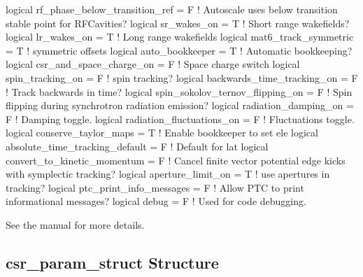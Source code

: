 {{{{{{{{\begin{example}
    logical rf_phase_below_transition_ref = F   ! Autoscale uses below transition stable point for RFCavities?
    logical sr_wakes_on = T                     ! Short range wakefields?
    logical lr_wakes_on = T                     ! Long range wakefields
    logical mat6_track_symmetric = T            ! symmetric offsets
    logical auto_bookkeeper = T                 ! Automatic bookkeeping?
    logical csr_and_space_charge_on = F         ! Space charge switch
    logical spin_tracking_on = F                ! spin tracking?
    logical backwards_time_tracking_on = F      ! Track backwards in time?
    logical spin_sokolov_ternov_flipping_on = F ! Spin flipping during synchrotron radiation emission?
    logical radiation_damping_on = F            ! Damping toggle.
    logical radiation_fluctuations_on = F       ! Fluctuations toggle.
    logical conserve_taylor_maps = T            ! Enable bookkeeper to set ele%
    logical absolute_time_tracking_default = F  ! Default for lat%
    logical convert_to_kinetic_momentum = F     ! Cancel finite vector potential edge kicks with symplectic tracking?
    logical aperture_limit_on = T               ! use apertures in tracking?
    logical ptc_print_info_messages = F         ! Allow PTC to print informational messages?
    logical debug = F                           ! Used for code debugging.
\end{example}
See the \bmad manual for more details.

\subsection{csr\_param\_struct Structure}
\label{s:csr.param.struct} 

}}}}}}}}
